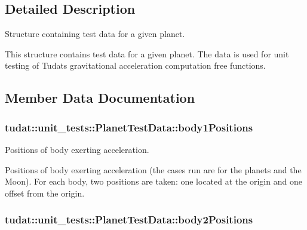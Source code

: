 \subsection{Detailed Description}
Structure containing test data for a given planet. 

This structure contains test data for a given planet. The data is used for unit testing of Tudat\textquotesingle{}s gravitational acceleration computation free functions. 

\subsection{Member Data Documentation}
\subsubsection[{\texorpdfstring{body1\+Positions}{body1Positions}}]{ tudat\+::unit\+\_\+tests\+::\+Planet\+Test\+Data\+::body1\+Positions}\hypertarget{structtudat_1_1unit__tests_1_1PlanetTestData_ab5a35deb6d7ffb8802b21240014c4e5a}{}\label{structtudat_1_1unit__tests_1_1PlanetTestData_ab5a35deb6d7ffb8802b21240014c4e5a}


Positions of body exerting acceleration. 

Positions of body exerting acceleration (the cases run are for the planets and the Moon). For each body, two positions are taken\+: one located at the origin and one offset from the origin. 
\subsubsection[{\texorpdfstring{body2\+Positions}{body2Positions}}]{ tudat\+::unit\+\_\+tests\+::\+Planet\+Test\+Data\+::body2\+Positions}\hypertarget{structtudat_1_1unit__tests_1_1PlanetTestData_a148b840cb4f45b9c3499a7f3d1bf193d}{}\label{structtudat_1_1unit__tests_1_1PlanetTestData_a148b840cb4f45b9c3499a7f3d1bf193d}


